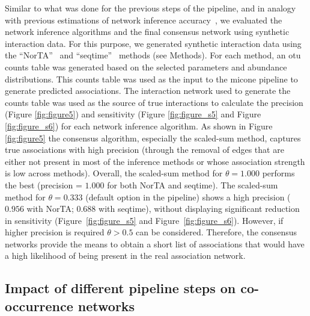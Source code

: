 \documentclass[letterpaper,12pt]{article}
\begin{document}
  Similar to what was done for the previous steps of the pipeline, and in analogy with previous estimations of network inference accuracy~\cite{Kurtz2015,Weiss2016}, we evaluated the network inference algorithms and the final consensus network using synthetic interaction data.
  For this purpose, we generated synthetic interaction data using the ``NorTA''~\cite{Kurtz2015} and ``seqtime''~\cite{faustSignaturesEcologicalProcesses2018} methods (see Methods).
  For each method, an \ac{otu} counts table was generated based on the selected parameters and abundance distributions.
  This counts table was used as the input to the \ac{micone} pipeline to generate predicted associations.
  The interaction network used to generate the counts table was used as the source of true interactions to calculate the precision (Figure \ref{fig:figure5}) and sensitivity (Figure \ref{fig:figure_s5} and Figure \ref{fig:figure_s6}) for each network inference algorithm.
  As shown in Figure \ref{fig:figure5} the consensus algorithm, especially the scaled-sum method, captures true associations with high precision (through the removal of edges that are either not present in most of the inference methods or whose association strength is low across methods).
  Overall, the scaled-sum method for $\theta=1.000$ performs the best (precision = $1.000$ for both NorTA and seqtime).
  The scaled-sum method for $\theta=0.333$ (default option in the pipeline) shows a high precision ($0.956$ with NorTA; $0.688$ with seqtime), without displaying significant reduction in sensitivity (Figure~\ref{fig:figure_s5} and Figure~\ref{fig:figure_s6}).
  However, if higher precision is required $\theta>0.5$ can be considered.
  Therefore, the consensus networks provide the means to obtain a short list of associations that would have a high likelihood of being present in the real association network.

  \FloatBarrier

  \subsection*{Impact of different pipeline steps on co-occurrence networks}
\end{document}
